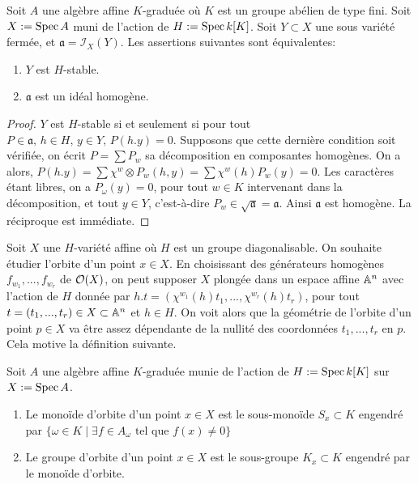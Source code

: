 \begin{prop}\label{stablehomogene}
Soit $A$ une algèbre affine $K$-graduée où $K$ est un groupe abélien de type fini. Soit $X:=\operatorname{Spec} A$ muni de l'action de $H:=\operatorname{Spec} k[K]$.  Soit $Y\subset X$ une sous variété fermée, et $\mathfrak{a}=\mathcal{I}_X(Y)$. Les assertions suivantes sont équivalentes:
\begin{enumerate}
\item $Y$ est $H$-stable.
\item $\mathfrak{a}$ est un idéal homogène.
\end{enumerate}
\end{prop}
\begin{proof}
$Y$ est $H$-stable si et seulement si pour tout $P\in \mathfrak{a},\,h\in H,\, y\in Y,\, P(h.y)=0$. Supposons que cette dernière condition soit vérifiée, on écrit $P=\sum P_w$ sa décomposition en composantes homogènes. On a alors, $P(h.y)=\sum \chi^w\otimes P_w(h,y) = \sum \chi^w(h) P_w(y)=0$. Les caractères étant libres, on a $P_{\omega}(y)=0$, pour tout $w\in K$ intervenant dans la décomposition, et tout $y\in Y$, c'est-à-dire $P_w\in \sqrt{\mathfrak{a}}=\mathfrak{a}$. Ainsi $\mathfrak{a}$ est homogène. La réciproque est immédiate. 
\end{proof}

Soit $X$ une $H$-variété affine où $H$ est un groupe diagonalisable. On souhaite étudier l'orbite d'un point $x\in X$. En choisissant des générateurs homogènes $f_{w_1},...,f_{w_r}$ de $\mathcal{O}(X)$, on peut supposer $X$ plongée dans un espace affine $\mathbb{A}^n$ avec l'action de $H$ donnée par $h.t=(\chi^{w_1}(h)t_1,...,\chi^{w_r}(h)t_r)$, pour tout $t=(t_1,...,t_r)\in X\subset \mathbb{A}^n$ et $h\in H$. On voit alors que la géométrie de l'orbite d'un point $p\in X$ va être assez dépendante de la nullité des coordonnées $t_1,..., t_r$ en $p$. Cela motive la définition suivante.

\begin{defn}
Soit $A$ une algèbre affine $K$-graduée munie de l'action de $H:=\operatorname{Spec} k[K]$ sur $X:=\operatorname{Spec} A$.
\begin{enumerate}
\item Le monoïde d'orbite d'un point $x\in X$ est le sous-monoïde $S_x\subset K$ engendré par $\lbrace\omega \in K\mid \exists f\in A_{\omega} \textrm{ tel que } f(x)\neq 0\rbrace$
\item Le groupe d'orbite d'un point $x\in X$ est le sous-groupe $K_x\subset K$ engendré par le monoïde d'orbite.
\end{enumerate}
\end{defn}

